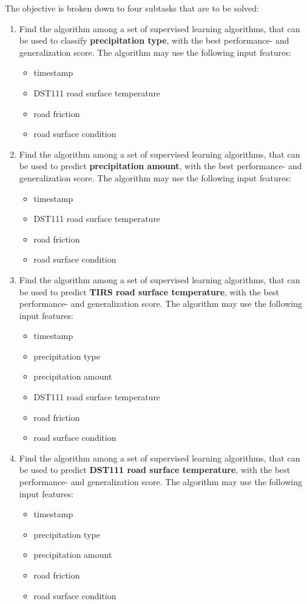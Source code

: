 	The objective is broken down to four subtasks that are to be solved:
	\begin{enumerate}
		\item Find the algorithm among a set of supervised learning algorithms, that can be used to classify \textbf{precipitation type}, with the best performance- and generalization score. The algorithm may use the following input features: 
			\begin{itemize}
				\item timestamp
				\item DST111 road surface temperature
				\item road friction
				\item road surface condition
			\end{itemize}
		\item Find the algorithm among a set of supervised learning algorithms, that can be used to predict \textbf{precipitation amount}, with the best performance- and generalization score. The algorithm may use the following input features: 
			\begin{itemize}
				\item timestamp
				\item DST111 road surface temperature
				\item road friction
				\item road surface condition
			\end{itemize}
		\item Find the algorithm among a set of supervised learning algorithms, that can be used to predict \textbf{TIRS road surface temperature}, with the best performance- and generalization score. The algorithm may use the following input features: 
			\begin{itemize}
				\item timestamp
				\item precipitation type
				\item precipitation amount
				\item DST111 road surface temperature
				\item road friction
				\item road surface condition
			\end{itemize}
		\item Find the algorithm among a set of supervised learning algorithms, that can be used to predict \textbf{DST111 road surface temperature}, with the best performance- and generalization score. The algorithm may use the following input features: 
			\begin{itemize}
				\item timestamp
				\item precipitation type
				\item precipitation amount
				\item road friction
				\item road surface condition
			\end{itemize}
	\end{enumerate}

